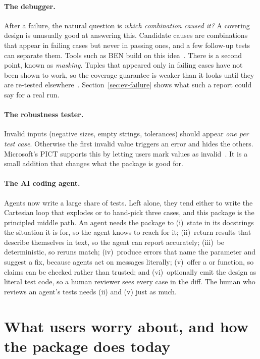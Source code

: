 \documentclass[11pt]{article}
\newcommand{\code}[1]{\texttt{\detokenize{#1}}}
\begin{document}
\paragraph{The debugger.}
After a failure, the natural question is \emph{which combination caused
it?} A covering design is unusually good at answering this. Candidate causes
are combinations that appear in failing cases but never in passing ones, and
a few follow-up tests can separate them. Tools such as BEN build on this
idea~\cite{ben}. There is a second point, known as \emph{masking}. Tuples
that appeared only in failing cases have not been shown to work, so the
coverage guarantee is weaker than it looks until they are re-tested
elsewhere~\cite{yilmaz2014}. Section~\ref{sec:ev-failure} shows what such a
report could say for a real run.

\paragraph{The robustness tester.}
Invalid inputs (negative sizes, empty strings, \code{NaN} tolerances) should
appear \emph{one per test case}. Otherwise the first invalid value triggers
an error and hides the others. Microsoft's PICT supports this by letting
users mark values as invalid~\cite{pict}. It is a small addition that
changes what the package is good for.

\paragraph{The AI coding agent.}
Agents now write a large share of tests. Left alone, they tend either to
write the Cartesian loop that explodes or to hand-pick three cases, and this
package is the principled middle path. An agent needs the package to
(i)~state in its docstrings the situation it is for, so the agent knows to
reach for it; (ii)~return results that describe themselves in text, so the
agent can report accurately; (iii)~be deterministic, so reruns match;
(iv)~produce errors that name the parameter and suggest a fix, because agents
act on messages literally; (v)~offer a \code{verify} or \code{coverage}
function, so claims can be checked rather than trusted; and (vi)~optionally
emit the design as literal test code, so a human reviewer sees every case in
the diff. The human who reviews an agent's tests needs (ii) and (v) just as
much.

\section{What users worry about, and how the package does today}\label{sec:concerns}
\end{document}
